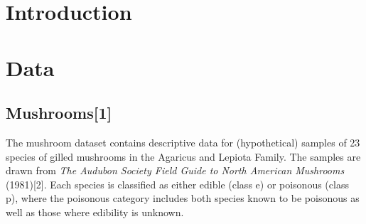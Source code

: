 \documentclass[11pt]{article}
\begin{document}
    \hypertarget{introduction}{%
\section{Introduction}\label{introduction}}

    

    \hypertarget{data}{%
\section{Data}\label{data}}

    \hypertarget{mushrooms}{%
\subsection{Mushrooms[1]}\label{mushrooms}}

The mushroom dataset contains descriptive data for (hypothetical)
samples of 23 species of gilled mushrooms in the Agaricus and Lepiota
Family. The samples are drawn from \emph{The Audubon Society Field Guide
to North American Mushrooms} (1981)[2]. Each species is classified as
either edible (class e) or poisonous (class p), where the poisonous
category includes both species known to be poisonous as well as those where edibility is unknown.
\end{document}

